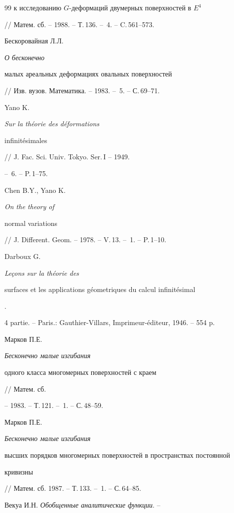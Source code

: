 \begin{thebibliography}{99}
{к исследованию $G$-деформаций двумерных поверхностей в $E^4$}


// Матем. сб. -- 1988. -- Т.\,136. -- \No\,4. -- C.\,561--573.





 Бескоровайная Л.Л. {\em О  бесконечно


малых ареальных деформациях овальных поверхностей}


// Изв. вузов. Математика. -- 1983. -- \No\,5. -- С.\,69--71.





 Yano K. {\em Sur la th\'eorie des d\'eformations


infinit\'esimales} // J. Fac. Sci. Univ. Tokyo. Ser.\,I -- 1949.


-- \No\,6. -- P.\,1--75.





 Chen  B.Y., Yano K. {\em On the theory of


normal variations}


// J. Different. Geom. -- 1978. -- V.\,13. -- \No\,1. -- P.\,1--10.





 Darboux G. {\em Le\c{c}ons sur la th\'eorie des


surfaces et les applications g\'eometriques du calcul infinit\'esimal}.


4 partie. -- Paris.: Gauthier-Villars, Imprimeur-\'editeur, 1946. -- 554 p.





 Марков П.Е. {\em Бесконечно малые изгибания


одного класса многомерных поверхностей с краем} // Матем. сб.


-- 1983. -- Т.\,121. -- \No\,1. -- С.\,48--59.





 Марков П.Е. {\em Бесконечно малые изгибания


высших порядков многомерных поверхностей в пространствах постоянной


кривизны} // Матем. сб. 1987. -- Т.\,133. -- \No\,1. -- С.\,64--85.





 Векуа И.Н. {\em Обобщенные аналитические функции}. -- 



\end{thebibliography}
